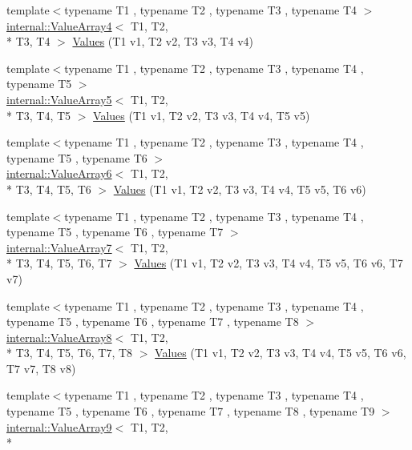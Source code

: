 \begin{DoxyCompactItemize}
\item 
{\footnotesize template$<$typename T1 , typename T2 , typename T3 , typename T4 $>$ }\\\hyperlink{classtesting_1_1internal_1_1ValueArray4}{internal\-::\-Value\-Array4}$<$ T1, T2, \\*
T3, T4 $>$ \hyperlink{namespacetesting_a4b14d4b6e471a1fb8ee3e5706dbc11c6}{Values} (T1 v1, T2 v2, T3 v3, T4 v4)
\item 
{\footnotesize template$<$typename T1 , typename T2 , typename T3 , typename T4 , typename T5 $>$ }\\\hyperlink{classtesting_1_1internal_1_1ValueArray5}{internal\-::\-Value\-Array5}$<$ T1, T2, \\*
T3, T4, T5 $>$ \hyperlink{namespacetesting_aa2c5f97a44a14ae95da8313b115b6396}{Values} (T1 v1, T2 v2, T3 v3, T4 v4, T5 v5)
\item 
{\footnotesize template$<$typename T1 , typename T2 , typename T3 , typename T4 , typename T5 , typename T6 $>$ }\\\hyperlink{classtesting_1_1internal_1_1ValueArray6}{internal\-::\-Value\-Array6}$<$ T1, T2, \\*
T3, T4, T5, T6 $>$ \hyperlink{namespacetesting_a552772c4c4daa68b5e995e0d64651150}{Values} (T1 v1, T2 v2, T3 v3, T4 v4, T5 v5, T6 v6)
\item 
{\footnotesize template$<$typename T1 , typename T2 , typename T3 , typename T4 , typename T5 , typename T6 , typename T7 $>$ }\\\hyperlink{classtesting_1_1internal_1_1ValueArray7}{internal\-::\-Value\-Array7}$<$ T1, T2, \\*
T3, T4, T5, T6, T7 $>$ \hyperlink{namespacetesting_a8fe9ae088304ebc64de1b076951e6eb8}{Values} (T1 v1, T2 v2, T3 v3, T4 v4, T5 v5, T6 v6, T7 v7)
\item 
{\footnotesize template$<$typename T1 , typename T2 , typename T3 , typename T4 , typename T5 , typename T6 , typename T7 , typename T8 $>$ }\\\hyperlink{classtesting_1_1internal_1_1ValueArray8}{internal\-::\-Value\-Array8}$<$ T1, T2, \\*
T3, T4, T5, T6, T7, T8 $>$ \hyperlink{namespacetesting_a1eda12e6518e4c51c1bb2e7cc9d31ffa}{Values} (T1 v1, T2 v2, T3 v3, T4 v4, T5 v5, T6 v6, T7 v7, T8 v8)
\item 
{\footnotesize template$<$typename T1 , typename T2 , typename T3 , typename T4 , typename T5 , typename T6 , typename T7 , typename T8 , typename T9 $>$ }\\\hyperlink{classtesting_1_1internal_1_1ValueArray9}{internal\-::\-Value\-Array9}$<$ T1, T2, \\*

\end{DoxyCompactItemize}
